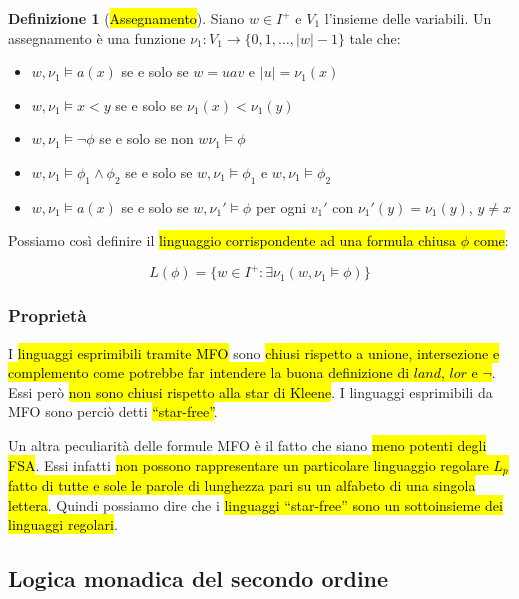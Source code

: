 \documentclass[a4paper,11pt,oneside]{article}
\theoremstyle{plain}
\theoremstyle{definition}
\newtheorem{defn}{Definizione}[section]
\theoremstyle{remark}
\begin{document}
\begin{defn}[\hl{Assegnamento}]\label{def:mfo-assegnamento}
  Siano $w\in I^+$ e $V_1$ l'insieme delle variabili. Un assegnamento è una
  funzione $\nu_1 : V_1 \to \{0,1,\ldots,|w|-1\}$ tale che:

  \begin{itemize}
    \item $w,\nu_1 \models a(x)$ se e solo se $w = uav$ e $|u| = \nu_1(x)$
    \item $w,\nu_1 \models x < y$ se e solo se $\nu_1(x) < \nu_1(y)$
    \item $w,\nu_1 \models \neg\phi$ se e solo se non $w\nu_1 \models \phi$
    \item $w,\nu_1 \models \phi_1 \land \phi_2$ se e solo se
      $w,\nu_1 \models \phi_1$ e $w,\nu_1 \models \phi_2$
    \item $w,\nu_1 \models a(x)$ se e solo se $w,\nu_1' \models \phi$ per ogni
      $v_1'$ con $\nu_1'(y) = \nu_1(y)$, $y \neq x$
  \end{itemize}
\end{defn}

Possiamo così definire il \hl{linguaggio corrispondente ad una formula chiusa
$\phi$ come}:

\[
  L(\phi) = \{w\in I^+ : \exists\nu_1 (w, \nu_1 \models \phi)\}
\]

\subsubsection{Proprietà}\label{sec:mfo-proprietà}

I \hl{linguaggi esprimibili tramite MFO} sono \hl{chiusi rispetto a unione,
intersezione e complemento come potrebbe far intendere la buona definizione di
$land$, $lor$ e $\neg$}. Essi però \hl{non sono chiusi rispetto alla star di
Kleene}. I linguaggi esprimibili da MFO sono perciò detti \hl{``star-free''}.

Un altra peculiarità delle formule MFO è il fatto che siano \hl{meno potenti
degli FSA\@}. Essi infatti \hl{non possono rappresentare un particolare
linguaggio regolare $L_p$ fatto di tutte e sole le parole di lunghezza pari su
un alfabeto di una singola lettera}. Quindi possiamo dire che i \hl{linguaggi
``star-free'' sono un sottoinsieme dei linguaggi regolari}.

\subsection{Logica monadica del secondo ordine}\label{sec:mso}
\end{document}
